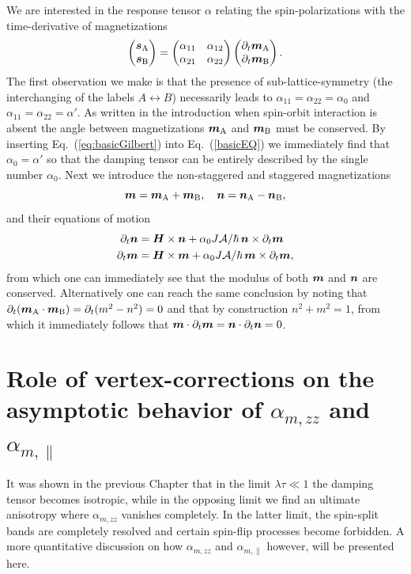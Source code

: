 We are interested in the response tensor $\alpha$ relating the spin-polarizations with the time-derivative of magnetizations
\begin{equation}
\label{eq:basicGilbert}
    \begin{pmatrix}
    \boldsymbol{s}_\text{A} \\ \boldsymbol{s}_\text{B}
    \end{pmatrix}
    =
    \begin{pmatrix}
    \alpha_{11} & \alpha_{12} \\ \alpha_{21} & \alpha_{22}
    \end{pmatrix}
    \begin{pmatrix}
    \partial_t \boldsymbol{m}_\text{A} \\ \partial_t\boldsymbol{m}_\text{B}
    \end{pmatrix}.
\end{equation}
The first observation we make is that the presence of sub-lattice-symmetry (the interchanging of the labels $A\leftrightarrow B$) necessarily leads to $\alpha_{11}=\alpha_{22}=\alpha_0$ and $\alpha_{11}=\alpha_{22}=\alpha'$. As written in the introduction when spin-orbit interaction is absent the angle between magnetizations $\boldsymbol{m}_\text{A}$ and $\boldsymbol{m}_\text{B}$ must be conserved. By inserting Eq.~(\ref{eq:basicGilbert}) into Eq.~(\ref{basicEQ}) we immediately find that $\alpha_0=\alpha'$ so that the damping tensor can be entirely described by the single number $\alpha_0$. Next we introduce the non-staggered and staggered magnetizations 
\begin{equation}
    \boldsymbol{m} = \boldsymbol{m}_\text{A} + \boldsymbol{m}_\text{B}, \quad \boldsymbol{n} = \boldsymbol{n}_\text{A} - \boldsymbol{n}_\text{B},
\end{equation}
and their equations of motion
\begin{align}
    \partial_t{\boldsymbol{n}}  &= \boldsymbol{H}\times\boldsymbol{n}  + \alpha_0 J\mathcal{A}/\hbar\,\boldsymbol{n}\times \partial_t\boldsymbol{m}\\
    \partial_t{\boldsymbol{m}}  &= \boldsymbol{H}\times\boldsymbol{m}  + \alpha_0 J\mathcal{A}/\hbar\,\boldsymbol{m}\times \partial_t\boldsymbol{m},
\end{align}
from which one can immediately see that the modulus of both $\boldsymbol{m}$ and $\boldsymbol{n}$ are conserved. Alternatively one can reach the same conclusion by noting that $\partial_t (\boldsymbol{m}_\text{A}\cdot\boldsymbol{m}_\text{B}) = \partial_t (m^2-n^2) = 0$ and that by construction $n^2+m^2=1$, from which it immediately follows that $\boldsymbol{m}\cdot\partial_t\boldsymbol{m} = \boldsymbol{n}\cdot\partial_t\boldsymbol{n} = 0$. 


\section{Role of vertex-corrections on the asymptotic behavior of $\alpha_{m,zz}$ and $\alpha_{m,\parallel}$}
It was shown in the previous Chapter that in the limit $\lambda\tau\ll1$ the damping tensor becomes isotropic, while in the opposing limit we find an ultimate anisotropy where $\alpha_{m,zz}$ vanishes completely. In the latter limit, the spin-split bands are completely resolved and certain spin-flip processes become forbidden. A more quantitative discussion on how $\alpha_{m,zz}$ and $\alpha_{m,\parallel}$ however, will be presented here. 

